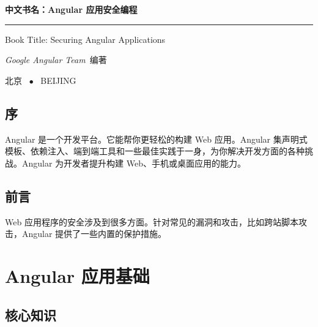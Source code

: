 \documentclass{progbookcn}
\begin{document}
\begin{titlepage}
  \vspace*{25ex}

  \hspace{0.05\textwidth}\begin{minipage}{.9\textwidth}
    \flushright

    {\textbf{中文书名：Angular 应用安全编程}}

    \rule{\linewidth}{.5pt}

    \vspace{2ex}

    {\textsf{Book Title: Securing Angular Applications}} \\

    \vspace{20ex}

    {\textit{Google Angular Team}~编著}
  \end{minipage}

  \vfill

  \centering
  {北京 ~$\bullet$ ~BEIJING}
\end{titlepage}
\thispagestyle{empty}


\frontmatter


\chapter{序}

Angular 是一个开发平台。它能帮你更轻松的构建 Web 应用。Angular 集声明式模板、依赖注入、端到端工具和一些最佳实践于一身，为你解决开发方面的各种挑战。Angular 为开发者提升构建 Web、手机或桌面应用的能力。

\chapter{前言}

Web 应用程序的安全涉及到很多方面。针对常见的漏洞和攻击，比如跨站脚本攻击，Angular 提供了一些内置的保护措施。

\clearpage
{
  \hypersetup{hidelinks}
  \tableofcontents
}


\mainmatter

\part{Angular 应用基础}


\chapter{核心知识}
\end{document}

